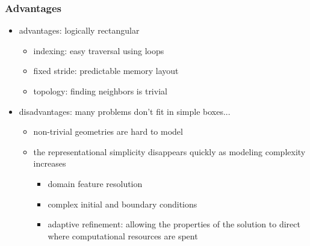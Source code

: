 \begin{frame}[fragile]
%
  \frametitle{Advantages}
%
  \begin{itemize}
%
  \item advantages: logically rectangular
    \begin{itemize}
    \item indexing: easy traversal using loops
    \item fixed stride: predictable memory layout
    \item topology: finding neighbors is trivial
    \end{itemize}
%
    \item disadvantages: many problems don't fit in simple boxes...
      \begin{itemize}
      \item non-trivial geometries are hard to model
      \item the representational simplicity disappears quickly as modeling complexity increases
        \begin{itemize}
        \item domain feature resolution
        \item complex initial and boundary conditions 
        \item adaptive refinement: allowing the properties of the solution to direct where
          computational resources are spent
        \end{itemize}
      \end{itemize}
% 
  \end{itemize}
%
\end{frame}


